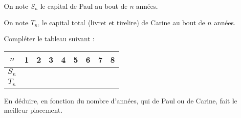 \documentclass[a4paper,11pt]{exam}
\begin{document}
\begin{questions}
	\question[2] 
	On note $S_n$ le capital de Paul au bout de $n$ années.
	
	\question[2] On note $T_n$, le capital total (livret et tirelire) de Carine au bout de $n$ années.
	
	\question[1] Compléter le tableau suivant :
	
	\begin{center}
		
		\begin{tabular}{|@{$\quad $}c@{$\quad $}| @{$\qquad $}c@{$\qquad $} | @{$\qquad $}c@{$\qquad $} | @{$\qquad $}c@{$\qquad $} | @{$\qquad $}c@{$\qquad $} |@{$\qquad $}c@{$\qquad $} |@{$\qquad $}c@{$\qquad $} |@{$\qquad $}c@{$\qquad $}|@{$\qquad $}c@{$\qquad $}|}
			\hline
			$n$                           & 1 & 2 & 3 & 4 & 5 & 6 & 7 & 8 \\ \hline
			$S_n$ &   &   &   &   &   &   &   &   \\ \hline
			$T_n$ &   &   &   &   &   &   &   &   \\ \hline
		\end{tabular}
	\end{center}
	
	\question[1] En déduire, en fonction du nombre d'années, qui de Paul ou de Carine, fait le meilleur placement.
	
\end{questions}
\end{document}
